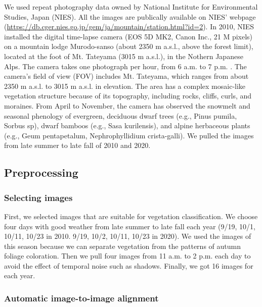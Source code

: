 \documentclass{article}
\begin{document}
We used repeat photography data owned by National Institute for
Environmental Studies, Japan (NIES). All the images are publically
available on NIES' webpage
(\url{https://db.cger.nies.go.jp/gem/ja/mountain/station.html?id=2}). In
2010, NIES installed the digital time-lapse camera (EOS 5D MK2, Canon
Inc., 21 M pixels) on a mountain lodge Murodo-sanso (about 2350 m
a.s.l., above the forest limit), located at the foot of Mt. Tateyama
(3015 m a.s.l.), in the Nothern Japanese Alps. The camera takes one
photograph per hour, from 6 a.m. to 7 p.m. . The camera's field of view
(FOV) includes Mt. Tateyama, which ranges from about 2350 m a.s.l. to
3015 m a.s.l. in elevation. The area has a complex mosaic-like
vegetation structure because of its topography, including rocks, cliffs,
curls, and moraines. From April to November, the camera has observed the
snowmelt and seasonal phenology of evergreen, deciduous dwarf trees
(e.g., Pinus pumila, Sorbus sp), dwarf bamboos (e.g., Sasa kurilensis),
and alpine herbaceous plants (e.g., Geum pentapetalum, Nephrophyllidium
crista-galli). We pulled the images from late summer to late fall of
2010 and 2020.

\hypertarget{preprocessing}{%
\subsection{Preprocessing}\label{preprocessing}}

\hypertarget{selecting-images}{%
\subsubsection{Selecting images}\label{selecting-images}}

First, we selected images that are suitable for vegetation
classification. We choose four days with good weather from late summer
to late fall each year (9/19, 10/1, 10/11, 10/23 in 2010. 9/19, 10/2,
10/11, 10/23 in 2020). We used the images of this season because we can
separate vegetation from the patterns of autumn foliage coloration. Then
we pull four images from 11 a.m. to 2 p.m. each day to avoid the effect
of temporal noise such as shadows. Finally, we got 16 images for each
year.

\hypertarget{automatic-image-to-image-alignment}{%
\subsubsection{Automatic image-to-image
alignment}\label{automatic-image-to-image-alignment}}
\end{document}
